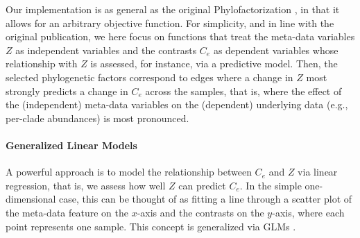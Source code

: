 Our implementation is as general as the original Phylofactorization \cite{Washburne2017a},
in that it allows for an arbitrary objective function.
For simplicity, and in line with the original publication,
we here focus on functions that treat the meta-data variables $Z$ as independent variables
and the contrasts $C_e$ as dependent variables whose relationship with $Z$ is assessed, for instance, via a predictive model.
Then, the selected phylogenetic factors correspond to edges
where a change in $Z$ most strongly predicts a change in $C_e$ across the samples,
that is, where the effect of the (independent) meta-data variables
on the (dependent) underlying data (e.g., per-clade abundances) is most pronounced.



\paragraph{Generalized Linear Models}
\label{sec:Factorization:sub:Methods:sub:ObjectiveFunction:par:GLMs}

A powerful approach is to model the relationship between $C_e$ and $Z$ via linear regression,
that is, we assess how well $Z$ can predict $C_e$.
In the simple one-dimensional case, this can be thought of as fitting a line through a scatter plot
of the meta-data feature on the $x$-axis and the contrasts on the $y$-axis, where each point represents one sample.
This concept is generalized via \acfp{GLM} \cite{Nelder1972,McCullagh1989,Agresti2018}.


